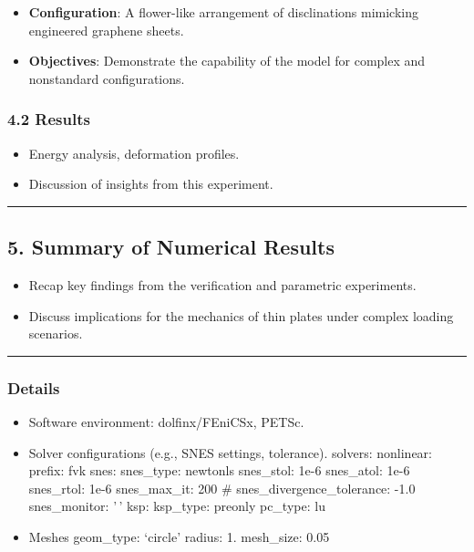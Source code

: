 \documentclass[
  11pt,
]{article}
\providecommand{\tightlist}{%
  \setlength{\itemsep}{0pt}\setlength{\parskip}{0pt}}
\begin{document}
\begin{itemize}
\tightlist
\item
  \textbf{Configuration}: A flower-like arrangement of disclinations
  mimicking engineered graphene sheets.
\item
  \textbf{Objectives}: Demonstrate the capability of the model for
  complex and nonstandard configurations.
\end{itemize}

\subsubsection{4.2 Results}\label{results}

\begin{itemize}
\tightlist
\item
  Energy analysis, deformation profiles.
\item
  Discussion of insights from this experiment.
\end{itemize}

\begin{center}\rule{0.5\linewidth}{0.5pt}\end{center}

\subsection{5. Summary of Numerical
Results}\label{summary-of-numerical-results}

\begin{itemize}
\tightlist
\item
  Recap key findings from the verification and parametric experiments.
\item
  Discuss implications for the mechanics of thin plates under complex
  loading scenarios.
\end{itemize}

\begin{center}\rule{0.5\linewidth}{0.5pt}\end{center}

\subsubsection{Details}\label{details}

\begin{itemize}
\item
  Software environment: dolfinx/FEniCSx, PETSc.
\item
  Solver configurations (e.g., SNES settings, tolerance). solvers:
  nonlinear: prefix: fvk snes: snes\_type: newtonls snes\_stol: 1e-6
  snes\_atol: 1e-6 snes\_rtol: 1e-6 snes\_max\_it: 200 \#
  snes\_divergence\_tolerance: -1.0 snes\_monitor: '\,' ksp: ksp\_type:
  preonly pc\_type: lu
\item
  Meshes geom\_type: `circle' radius: 1. mesh\_size: 0.05
\end{itemize}
\end{document}
